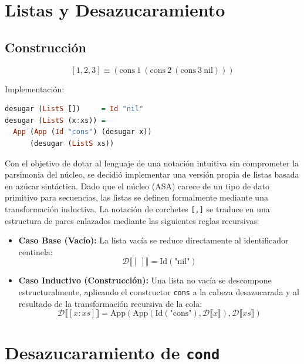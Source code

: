 \documentclass[a4paper,12pt]{article}
\begin{document}
\begin{tcolorbox}[title= Corrección: Desugar modulo A4, breakable]
\begin{enumerate}
\section{Listas y Desazucaramiento}

\subsection{Construcción}

\[
[1,2,3] \equiv ( \mathrm{cons}\ 1\ (\mathrm{cons}\ 2\ (\mathrm{cons}\ 3\ \mathrm{nil})))
\]

Implementación:

\begin{lstlisting}[language=Haskell]
desugar (ListS [])     = Id "nil"
desugar (ListS (x:xs)) =
  App (App (Id "cons") (desugar x))
      (desugar (ListS xs))
\end{lstlisting}

\vspace{0.5cm}\textbf{}Con el objetivo de dotar al lenguaje de una notación intuitiva sin comprometer la parsimonia del núcleo, se decidió implementar una versión propia de listas basada en azúcar sintáctica. Dado que el núcleo (ASA) carece de un tipo de dato primitivo para secuencias, las listas se definen formalmente mediante una transformación inductiva. La notación de corchetes \texttt{[,]} se traduce en una estructura de pares enlazados mediante las siguientes reglas recursivas:\begin{itemize}\item \textbf{Caso Base (Vacío):} La lista vacía se reduce directamente al identificador centinela:$$ \mathcal{D}\llbracket [\ ] \rrbracket = \text{Id}(\text{"nil"}) $$\item \textbf{Caso Inductivo (Construcción):} Una lista no vacía se descompone estructuralmente, aplicando el constructor \texttt{cons} a la cabeza desazucarada y al resultado de la transformación recursiva de la cola:$$ \mathcal{D}\llbracket [x : xs] \rrbracket = \text{App}(\text{App}(\text{Id}(\text{"cons"}), \mathcal{D}\llbracket x \rrbracket), \mathcal{D}\llbracket xs \rrbracket) $$\end{itemize}

\section{Desazucaramiento de \texttt{cond}}


\end{enumerate}
\end{tcolorbox}
\end{document}
